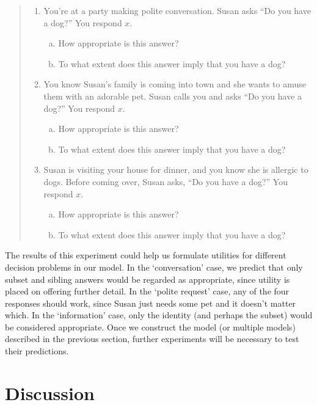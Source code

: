 \documentclass[12pt]{amsart}
\begin{document}
\begin{quote}
\begin{enumerate} [1.]
\item You're at a party making polite conversation. Susan asks ``Do you have a dog?'' You respond $x$.
	\begin{enumerate}[(a)]
     \item How appropriate is this answer?
     \item To what extent does this answer imply that you have a dog?
	\end{enumerate}
\item You know Susan's family is coming into town and she wants to amuse them with an adorable pet. Susan calls you and asks ``Do you have a dog?'' You respond $x$.
     \begin{enumerate}[(a)]
     \item How appropriate is this answer?
     \item To what extent does this answer imply that you have a dog?
     \end{enumerate}

\item Susan is visiting your house for dinner, and you know she is allergic to dogs. Before coming over, Susan asks, ``Do you have a dog?'' You respond $x$.
     \begin{enumerate}[(a)] 
     \item How appropriate is this answer?
     \item To what extent does this answer imply that you have a dog?
     \end{enumerate}
\end{enumerate}
\end{quote}

The results of this experiment could help us formulate utilities for different decision problems in our model. In the `conversation' case, we predict that only subset and sibling answers would be regarded as appropriate, since utility is placed on offering further detail. In the `polite request' case, any of the four responses should work, since Susan just needs some pet and it doesn't matter which. In the `information' case, only the identity (and perhaps the subset) would be considered appropriate. Once we construct the model (or multiple models) described in the previous section, further experiments will be necessary to test their predictions.

\section{Discussion}
\end{document}
